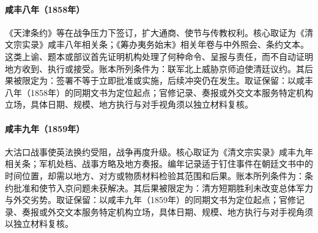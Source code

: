 \hypertarget{ledger:EQ-1858-TIANJIN-TREATIES}{}\paragraph{咸丰八年（1858年）}《天津条约》等在战争压力下签订，扩大通商、使节与传教权利。核心取证为《清文宗实录》咸丰八年相关条；《筹办夷务始末》相关年卷与中外照会、条约文本。这类上谕、题本或部议首先证明机构处理了何种命令、呈报与责任，而不自动证明地方收到、执行或接受。账本所列条件为：联军北上威胁京师迫使清廷议约。其后果被限定为：签署不等于立即批准或实施，后续冲突仍在发生。取证保留：以咸丰八年（1858年）的同期文书为定位起点；官修记录、奏报或外交文本服务特定机构立场，具体日期、规模、地方执行与对手视角须以独立材料复核。
\hypertarget{ledger:EQ-1859-TAKU-BATTLE}{}\paragraph{咸丰九年（1859年）}大沽口战事使英法换约受阻，战争再度升级。核心取证为《清文宗实录》咸丰九年相关条；军机处档、战事方略及地方奏报。编年记录适于钉住事件在朝廷文书中的时间位置，却需以地方、对方或物质材料检验其范围和后果。账本所列条件为：条约批准和使节入京问题未获解决。其后果被限定为：清方短期胜利未改变总体军力与外交劣势。取证保留：以咸丰九年（1859年）的同期文书为定位起点；官修记录、奏报或外交文本服务特定机构立场，具体日期、规模、地方执行与对手视角须以独立材料复核。

